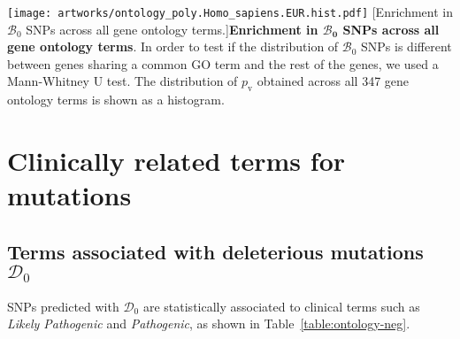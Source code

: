 \documentclass{article}
\newcommand{\SphyDel}{\mathcal{D}_0}
\newcommand{\SphyBen}{\mathcal{B}_0}
\begin{document}
    \begin{center}
        \texttt{[image: artworks/ontology\_poly.Homo\_sapiens.EUR.hist.pdf]}
        [Enrichment in $\SphyBen$ SNPs across all gene ontology terms.]{\textbf{Enrichment in $\bm{\SphyBen}$ SNPs across all gene ontology terms}. In order to test if the distribution of $\SphyBen$ SNPs is different between genes sharing a common GO term and the rest of the genes, we used a Mann-Whitney U test. The distribution of $p_{\mathrm{v}}$ obtained across all 347 gene ontology terms is shown as a histogram.\label{fig:ontology-p}}
    \end{center}

    \newpage

    \section{Clinically related terms for mutations}

    \subsection{Terms associated with deleterious mutations \texorpdfstring{$\SphyDel$}{D₀}}
    SNPs predicted with $\SphyDel$ are statistically associated to clinical terms such as \textit{Likely Pathogenic} and \textit{Pathogenic}, as shown in Table~\ref{table:ontology-neg}.
\end{document}
